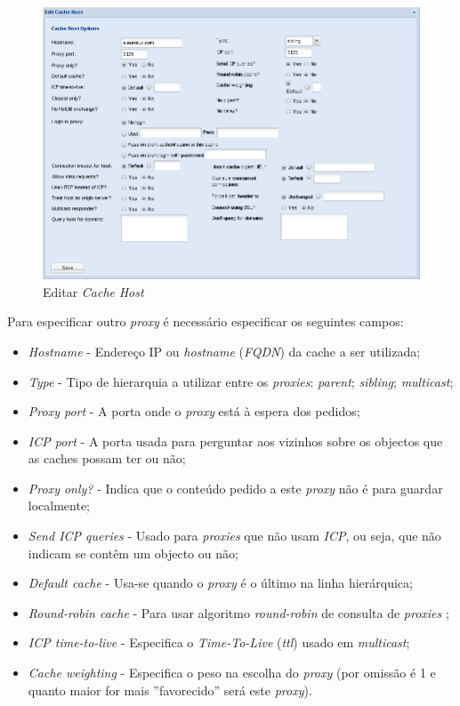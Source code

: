 \begin{figure}[H]
    \begin{center}
    \includegraphics[scale=0.38]{screenshots/etfw/etfw_squid_othercaches_02.png}
    \caption{Editar \textit{Cache} \textit{Host}}
    \label{fig:etfw_squid_othercaches_01}
    \end{center}
\end{figure}

Para especificar outro \textit{proxy} é necessário especificar os seguintes campos:

\begin{itemize}
    \item \textit{Hostname} - Endereço IP ou \textit{hostname} (\textit{FQDN}) da cache a ser utilizada;
    \item \textit{Type} - Tipo de hierarquia a utilizar entre os \textit{proxies}:
        \subitem \textit{parent};
        \subitem \textit{sibling};
        \subitem \textit{multicast};
    \item \textit{Proxy port} - A porta onde o \textit{proxy} está à espera dos pedidos;
    \item \textit{ICP port} - A porta usada para perguntar aos vizinhos sobre os objectos que as caches possam ter ou não;
    \item \textit{Proxy only?} - Indica que o conteúdo pedido a este \textit{proxy} não é para guardar localmente;
    \item \textit{Send ICP queries} - Usado para \textit{proxies} que não usam \textit{ICP}, ou seja, que não indicam se contêm um objecto ou não;
    \item \textit{Default cache} - Usa-se quando o \textit{proxy} é o último na linha hierárquica;
    \item \textit{Round-robin cache} - Para usar algoritmo \textit{round-robin} de consulta de \textit{proxies} ;
    \item \textit{ICP time-to-live} - Especifica o \textit{Time-To-Live} (\textit{ttl}) usado em \textit{multicast};
    \item \textit{Cache weighting} - Especifica o peso na escolha do \textit{proxy} (por omissão é 1 e quanto maior for mais ''favorecido'' será este \textit{proxy}).
\end{itemize}


